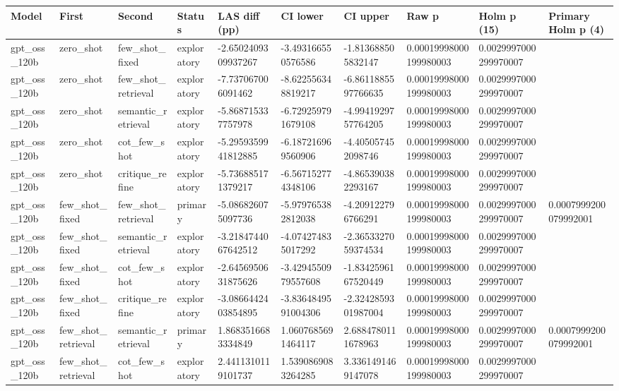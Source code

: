 \begin{tabular}{llllllllll}
\hline
Model & First & Second & Status & LAS diff (pp) & CI lower & CI upper & Raw p & Holm p (15) & Primary Holm p (4) \\
\hline
gpt\_oss\_120b & zero\_shot & few\_shot\_fixed & exploratory & -2.6502409309937267 & -3.493166550576586 & -1.813688505832147 & 0.00019998000199980003 & 0.0029997000299970007 &  \\
gpt\_oss\_120b & zero\_shot & few\_shot\_retrieval & exploratory & -7.737067006091462 & -8.622556348819217 & -6.8611885597766635 & 0.00019998000199980003 & 0.0029997000299970007 &  \\
gpt\_oss\_120b & zero\_shot & semantic\_retrieval & exploratory & -5.868715337757978 & -6.729259791679108 & -4.9941929757764205 & 0.00019998000199980003 & 0.0029997000299970007 &  \\
gpt\_oss\_120b & zero\_shot & cot\_few\_shot & exploratory & -5.2959359941812885 & -6.187216969560906 & -4.405057452098746 & 0.00019998000199980003 & 0.0029997000299970007 &  \\
gpt\_oss\_120b & zero\_shot & critique\_refine & exploratory & -5.736885171379217 & -6.567152774348106 & -4.865390382293167 & 0.00019998000199980003 & 0.0029997000299970007 &  \\
gpt\_oss\_120b & few\_shot\_fixed & few\_shot\_retrieval & primary & -5.086826075097736 & -5.979765382812038 & -4.209122796766291 & 0.00019998000199980003 & 0.0029997000299970007 & 0.0007999200079992001 \\
gpt\_oss\_120b & few\_shot\_fixed & semantic\_retrieval & exploratory & -3.2184744067642512 & -4.074274835017292 & -2.3653327059374534 & 0.00019998000199980003 & 0.0029997000299970007 &  \\
gpt\_oss\_120b & few\_shot\_fixed & cot\_few\_shot & exploratory & -2.6456950631875626 & -3.4294550979557608 & -1.8342596167520449 & 0.00019998000199980003 & 0.0029997000299970007 &  \\
gpt\_oss\_120b & few\_shot\_fixed & critique\_refine & exploratory & -3.0866442403854895 & -3.8364849591004306 & -2.3242859301987004 & 0.00019998000199980003 & 0.0029997000299970007 &  \\
gpt\_oss\_120b & few\_shot\_retrieval & semantic\_retrieval & primary & 1.8683516683334849 & 1.0607685691464117 & 2.6884780111678963 & 0.00019998000199980003 & 0.0029997000299970007 & 0.0007999200079992001 \\
gpt\_oss\_120b & few\_shot\_retrieval & cot\_few\_shot & exploratory & 2.4411310119101737 & 1.5390869083264285 & 3.3361491469147078 & 0.00019998000199980003 & 0.0029997000299970007 &  \\

\end{tabular}
